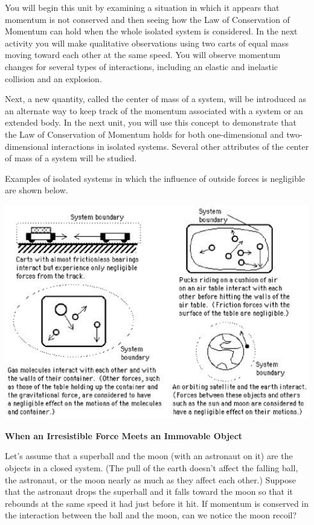 You will begin this unit by examining a situation in which it appears that momentum
is not conserved and then seeing how the Law of Conservation of Momentum can
hold when the whole isolated system is considered. In the next activity you
will make qualitative observations using two carts of equal mass moving toward
each other at the same speed. You will observe momentum changes for several
types of interactions, including an elastic and inelastic collision and an explosion. 

Next, a new quantity, called the center of mass of a system, will be introduced
as an alternate way to keep track of the momentum associated with a system or
an extended body. In the next unit, you will use this concept to demonstrate
that the Law of Conservation of Momentum holds for both one-dimensional and
two-dimensional interactions in isolated systems. Several other attributes of
the center of mass of a system will be studied.

Examples of isolated systems in which the influence of outside forces is negligible
are shown below.

\vspace{0.3cm}
{\par\centering \includegraphics{mom_cons/mom_cons_fig1.eps} \par}
\vspace{0.3cm}

\textbf{When an Irresistible Force Meets an Immovable Object }

Let's assume that a superball and the moon (with an astronaut on it) are the
objects in a closed system. (The pull of the earth doesn't affect the falling
ball, the astronaut, or the moon nearly as much as they affect each other.)
Suppose that the astronaut drops the superball and it falls toward the moon
so that it rebounds at the same speed it had just before it hit. If momentum
is conserved in the interaction between the ball and the moon, can we notice
the moon recoil? 


